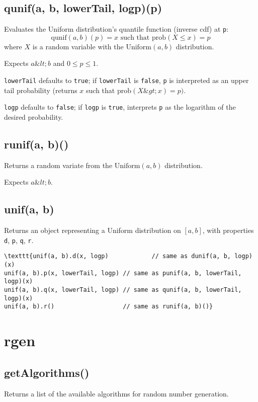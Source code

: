 \documentclass{article}
\begin{document}
    \subsection*{qunif(a, b, lowerTail, logp)(p)}
    Evaluates the Uniform distribution's quantile function
(inverse cdf) at \texttt{p}:
$$\textrm{qunif}(a, b)(p) = x \textrm{ such that } \textrm{prob}(X \leq x) = p$$
where $X$ is a random variable with the $\textrm{Uniform}(a, b)$ distribution.


Expects $a \&lt; b$ and $0 \leq p \leq 1$.


\texttt{lowerTail} defaults to \texttt{true}; if \texttt{lowerTail} is \texttt{false}, \texttt{p} is
interpreted as an upper tail probability (returns
$x$ such that $\textrm{prob}(X \&gt; x) = p)$.


\texttt{logp} defaults to \texttt{false}; if \texttt{logp} is \texttt{true}, interprets \texttt{p} as
the logarithm of the desired probability.


    \subsection*{runif(a, b)()}
    Returns a random variate from the $\textrm{Uniform}(a,b)$ distribution.


Expects $a\&lt;b$.


    \subsection*{unif(a, b)}
    Returns an object representing a Uniform distribution on $[a, b]$,
with properties \texttt{d}, \texttt{p}, \texttt{q}, \texttt{r}.


\begin{lstlisting}
\texttt{unif(a, b).d(x, logp)            // same as dunif(a, b, logp)(x)
unif(a, b).p(x, lowerTail, logp) // same as punif(a, b, lowerTail, logp)(x)
unif(a, b).q(x, lowerTail, logp) // same as qunif(a, b, lowerTail, logp)(x)
unif(a, b).r()                   // same as runif(a, b)()}\end{lstlisting}

  \section{rgen}
    \subsection*{getAlgorithms()}
    Returns a list of the available algorithms for random number
generation.
\end{document}
